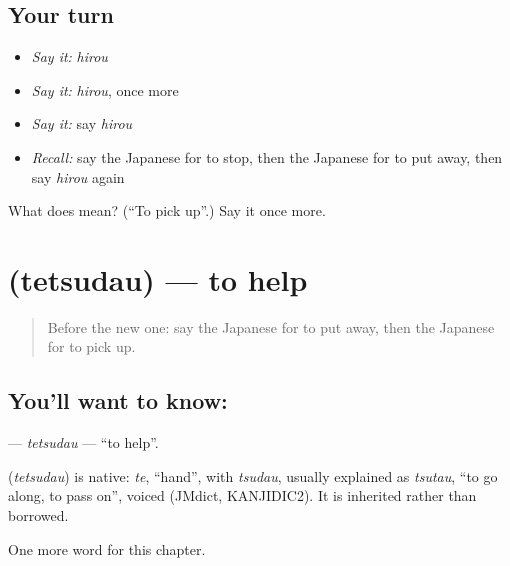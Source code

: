 \subsection*{Your turn}
\begin{itemize}
\raggedright
  \item \emph{Say it:} \emph{hirou}
  \item \emph{Say it:} \emph{hirou}, once more
  \item \emph{Say it:} say \emph{hirou}
  \item \emph{Recall:} say the Japanese for to stop, then the Japanese for to put away, then say \emph{hirou} again
\end{itemize}

\begin{tcolorbox}[breakable,colback=teal!4,colframe=teal!35!black,title={Before you move on}]
What does  mean? (\textquotedblleft{}To pick up\textquotedblright{}.) Say it once more.
\end{tcolorbox}
\section[\texorpdfstring{\ja{てつだう} (tetsudau)}{てつだう (tetsudau)}]{ (tetsudau) — to help}

\label{lesson:JA-C91-tetsudau}



\begin{quote}
Before the new one: say the Japanese for to put away, then the Japanese for to pick up.
\end{quote}

\subsection*{You'll want to know: }
\textbf{} — \emph{tetsudau} — \textquotedblleft{}to help\textquotedblright{}.

\begin{cousinweb}
\textbf{} (\emph{tetsudau}) is native: \emph{te}, \textquotedblleft{}hand\textquotedblright{}, with \emph{tsudau}, usually explained as \emph{tsutau}, \textquotedblleft{}to go along, to pass on\textquotedblright{}, voiced (JMdict, KANJIDIC2). It is inherited rather than borrowed.
\end{cousinweb}

\begin{grammarlens}[title={What you've built}]
One more word for this chapter.
\end{grammarlens}

